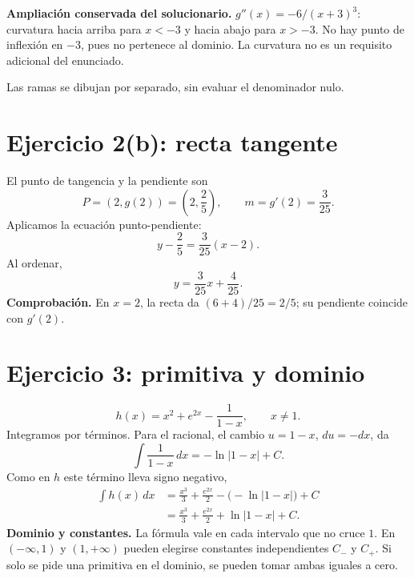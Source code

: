 \documentclass[11pt]{article}
\begin{document}
\textbf{Ampliación conservada del solucionario.} $g''(x)=-6/(x+3)^3$: curvatura hacia arriba para $x<-3$ y hacia abajo para $x>-3$. No hay punto de inflexión en $-3$, pues no pertenece al dominio. La curvatura no es un requisito adicional del enunciado.
\begin{center}
\end{center}
Las ramas se dibujan por separado, sin evaluar el denominador nulo.
\clearpage
\section*{Ejercicio 2(b): recta tangente}
El punto de tangencia y la pendiente son
\[P=(2,g(2))=\left(2,\frac25\right),\qquad m=g'(2)=\frac3{25}.\]
Aplicamos la ecuación punto-pendiente:
\[y-\frac25=\frac3{25}(x-2).\]
Al ordenar,
\[\boxed{y=\frac3{25}x+\frac4{25}}.\]
\textbf{Comprobación.} En $x=2$, la recta da $(6+4)/25=2/5$; su pendiente coincide con $g'(2)$.
\begin{center}
\end{center}
\clearpage
\section*{Ejercicio 3: primitiva y dominio}
\[h(x)=x^2+e^{2x}-\frac1{1-x},\qquad x\neq1.\]
Integramos por términos. Para el racional, el cambio $u=1-x$, $du=-dx$, da
\[\int\frac1{1-x}\,dx=-\ln|1-x|+C.\]
Como en $h$ este término lleva signo negativo,
\begin{align*}
\int h(x)\,dx
&=\frac{x^3}{3}+\frac{e^{2x}}2-\bigl(-\ln|1-x|\bigr)+C\\
&=\boxed{\frac{x^3}{3}+\frac{e^{2x}}2+\ln|1-x|+C}.
\end{align*}
\textbf{Dominio y constantes.} La fórmula vale en cada intervalo que no cruce $1$. En $(-\infty,1)$ y $(1,+\infty)$ pueden elegirse constantes independientes $C_-$ y $C_+$. Si solo se pide una primitiva en el dominio, se pueden tomar ambas iguales a cero.
\end{document}
